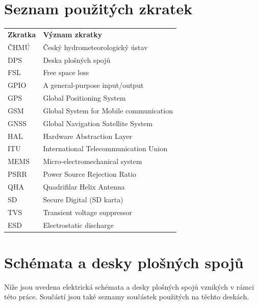 \documentclass[twoside]{ctuthesis}
\theoremstyle{plain}
\theoremstyle{definition}
\theoremstyle{note}
\begin{document}
%
%
\appendix
\chapter*{Seznam použitých zkratek}
\noindent


\begin{tabularx}{\linewidth}
{ l >{\raggedright\arraybackslash}X }
\bfseries Zkratka & \bfseries Význam zkratky \\\Midrule
ČHMÚ & Český hydrometeorologický ústav\\
DPS & Deska plošných spojů\\
FSL & Free space loss\\
GPIO & A general-purpose input/output\\
GPS & Global Positioning System\\
GSM &Global System for Mobile communication\\
GNSS & Global Navigation Satellite System\\
HAL & Hardware Abstraction Layer\\
ITU & International Telecommunication Union\\
MEMS & Micro-electromechanical system\\
PSRR & Power Source Rejection Ratio\\
QHA & Quadrifilar Helix Antenna\\
SD & Secure Digital (SD karta)\\
TVS & Transient voltage suppressor \\
ESD & Electrostatic discharge\\
\end{tabularx}

\chapter*{Schémata a desky plošných spojů}
Níže jsou uvedena elektrická schémata a desky plošných spojů vznikých v rámci této práce. Součástí jsou také seznamy součástek použitých na těchto deskách.





\end{document}
